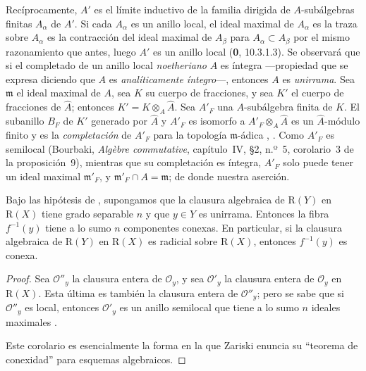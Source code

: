 Recíprocamente, $A'$ es el límite inductivo de la familia dirigida de
$A$-subálgebras finitas $A_\alpha$ de $A'$. Si cada $A_\alpha$ es un anillo local, el ideal maximal
de $A_\alpha$ es la traza sobre $A_\alpha$ es la contracción del ideal maximal de $A_\beta$ para
$A_\alpha\subset A_\beta$ por el mismo razonamiento que antes, luego $A'$ es un anillo local (\textbf{0}, 10.3.1.3). Se observará que si el completado de un anillo local \emph{noetheriano} $A$ es íntegra ---propiedad que se expresa diciendo que
$A$ es \emph{analíticamente íntegro}---, entonces $A$ es \emph{unirrama}.
Sea $\mathfrak m$ el ideal maximal de $A$, sea $K$ su cuerpo de
fracciones, y sea $K'$ el cuerpo de fracciones de $\widehat A$;
entonces
$K'=K\otimes_A\widehat A$.
Sea $A'_F$ una $A$-subálgebra finita de $K$. El subanillo $B_F$ de
$K'$ generado por $\widehat A$ y $A'_F$ es isomorfo a
$A'_F\otimes_A\widehat A$
es un $\widehat A$-módulo finito y es la \emph{completación} de $A'_F$
para la topología $\mathfrak m$-ádica
, . Como $A'_F$ es semilocal
(Bourbaki, \emph{Alg\`ebre commutative}, capítulo~IV, \S2, n.º~5,
corolario~3 de la proposición~9), mientras que su completación es
íntegra, $A'_F$ solo puede tener un ideal maximal $\mathfrak m'_F$, y
$\mathfrak m'_F\cap A=\mathfrak m$; de donde nuestra aserción.
\begin{corollary}[4.3.7]
\label{III.4.3.7}
\label{III.4.3.7-fr}
Bajo las hipótesis de , supongamos que la clausura
algebraica de $\mathrm R(Y)$ en $\mathrm R(X)$ tiene grado separable
$n$ y que $y\in Y$ es unirrama. Entonces la fibra $f^{-1}(y)$ tiene a
lo sumo $n$ componentes conexas. En particular, si la clausura
algebraica de $\mathrm R(Y)$ en $\mathrm R(X)$ es radicial sobre
$\mathrm R(X)$, entonces $f^{-1}(y)$ es conexa.
\end{corollary}

\begin{proof}
Sea $\mathcal O''_y$ la clausura entera de $\mathcal O_y$, y sea
$\mathcal O'_y$ la clausura entera de $\mathcal O_y$ en $\mathrm R(X)$.
Esta última es también la clausura entera de $\mathcal O''_y$; pero se sabe que si $\mathcal O''_y$ es local, entonces $\mathcal O'_y$ es
un anillo semilocal que tiene a lo sumo $n$ ideales maximales
\cite[vol.~I, p.~289, Theorem~22]{I-13}.

Este corolario es esencialmente la forma en la que Zariski enuncia su
``teorema de conexidad'' para esquemas algebraicos.
\end{proof}


